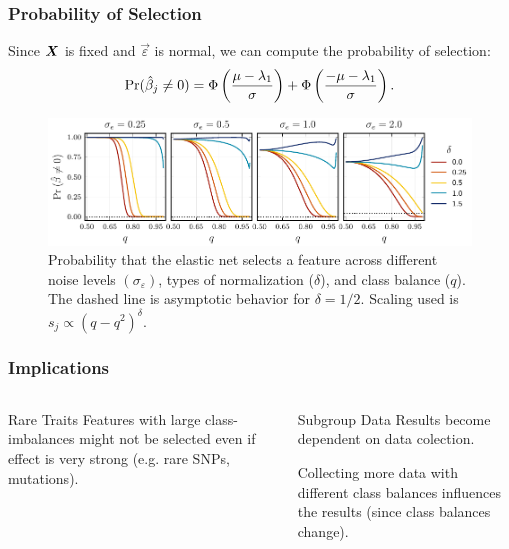 \documentclass[aspectratio=1610,onlytextwidth]{beamer}
\begin{document}
\begin{frame}[c]
  \frametitle{Probability of Selection}

  Since \(\boldsymbol{X}\) is fixed and \(\vec{\varepsilon}\) is normal, we can compute the
  probability of selection:
  \[
    \Pr(\hat{\beta}_j \neq 0) = \operatorname{\Phi}\left(\frac{\mu - \lambda_1}{\sigma}\right) + \operatorname{\Phi}\left(\frac{- \mu -\lambda_1}{\sigma}\right).
  \]

  \begin{figure}[htpb]
    \centering
    \includegraphics[width=\textwidth]{figures/selection_probability.pdf}
    \caption{%
      Probability that the elastic net selects a feature across different noise levels \((\sigma_\varepsilon)\), types of normalization (\(\delta\)), and class balance (\(q\)).
      The dashed line is asymptotic behavior for \(\delta = 1/2\).
      Scaling used is \(s_j \propto (q - q^2)^\delta\).
    }
  \end{figure}
\end{frame}

\begin{frame}[c]
  \frametitle{Implications}
  \begin{columns}[T]
    \begin{column}{0.45\textwidth}
      \begin{block}{Rare Traits}
        Features with large class-imbalances might not be selected even if effect is \alert{very strong}
        (e.g. rare SNPs, mutations).
      \end{block}
    \end{column}
    \pause
    \begin{column}{0.45\textwidth}
      \begin{block}{Subgroup Data}
        Results become dependent on data colection. \medskip

        Collecting more data with different class balances influences the results (since class
        balances change).
      \end{block}

    \end{column}
  \end{columns}
\end{frame}
\end{document}
